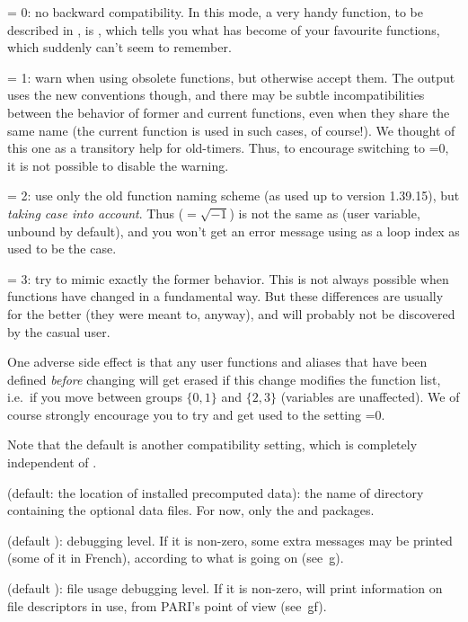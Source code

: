 \quad {} = 0: no backward compatibility. In this mode, a very
handy function, to be described in , is ,
which tells you what has become of your favourite functions, which 
suddenly can't seem to remember.

\quad {} = 1: warn when using obsolete functions, but
otherwise accept them. The output uses the new conventions though, and
there may be subtle incompatibilities between the behavior of former and
current functions, even when they share the same name (the current function
is used in such cases, of course!). We thought of this one as a transitory
help for  old-timers. Thus, to encourage switching to =0,
it is not possible to disable the warning.

\quad {} = 2: use only the old function naming scheme (as
used up to version 1.39.15), but \emph{taking case into account}. Thus
 (${}=\sqrt{-1}$) is not the same as  (user variable, unbound
by default), and you won't get an error message using  as a loop
index as used to be the case.

\quad {} = 3: try to mimic exactly the former behavior. This
is not always possible when functions have changed in a fundamental way.
But these differences are usually for the better (they were meant to,
anyway), and will probably not be discovered by the casual user.

One adverse side effect is that any user functions and aliases that have
been defined \emph{before} changing  will get erased if this
change modifies the function list, i.e.~if you move between groups
$\{0,1\}$ and $\{2,3\}$ (variables are unaffected). We of course strongly
encourage you to try and get used to the setting =0.

Note that the default  is another compatibility setting,
which is completely independent of .

 (default: the location of installed precomputed data):
the name of directory containing the optional data files. For now,
only the  and  packages.

 (default ): debugging level. If it is non-zero,
some extra messages may be printed (some of it in French), according to
what is going on (see~\b{g}).

 (default ): file usage debugging level. If it
is non-zero,  will print information on file descriptors in use, from
PARI's point of view (see~\b{gf}).

